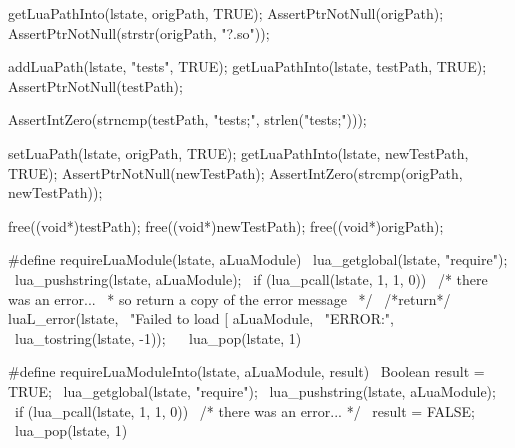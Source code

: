 
\startCTest
  getLuaPathInto(lstate, origPath, TRUE);
  AssertPtrNotNull(origPath);
  AssertPtrNotNull(strstr(origPath, "?.so"));

  addLuaPath(lstate, "tests", TRUE);
  getLuaPathInto(lstate, testPath, TRUE);
  AssertPtrNotNull(testPath);

  AssertIntZero(strncmp(testPath, "tests;", strlen("tests;")));
  
  setLuaPath(lstate, origPath, TRUE);
  getLuaPathInto(lstate, newTestPath, TRUE);
  AssertPtrNotNull(newTestPath);
  AssertIntZero(strcmp(origPath, newTestPath));
  
  free((void*)testPath);
  free((void*)newTestPath);
  free((void*)origPath);
\stopCTest
\stopTestCase
\stopTestSuite


\startCHeader
#define requireLuaModule(lstate, aLuaModule)  \
  lua_getglobal(lstate, "require");           \
  lua_pushstring(lstate, aLuaModule);         \
  if (lua_pcall(lstate, 1, 1, 0)) {           \
    /* there was an error...                  \
     * so return a copy of the error message  \
     */                                       \
    /*return*/ luaL_error(lstate,             \
      "Failed to load [%
      aLuaModule,                             \
      "ERROR:\n",                             \
      lua_tostring(lstate, -1));              \
  }                                           \
  lua_pop(lstate, 1)
\stopCHeader

\startCHeader
#define requireLuaModuleInto(lstate, aLuaModule, result)  \
  Boolean result = TRUE;                                  \
  lua_getglobal(lstate, "require");                       \
  lua_pushstring(lstate, aLuaModule);                     \
  if (lua_pcall(lstate, 1, 1, 0)) {                       \
    /* there was an error... */                           \
    result = FALSE;                                       \
  }                                                       \
  lua_pop(lstate, 1)
\stopCHeader

\stopTestSuite

